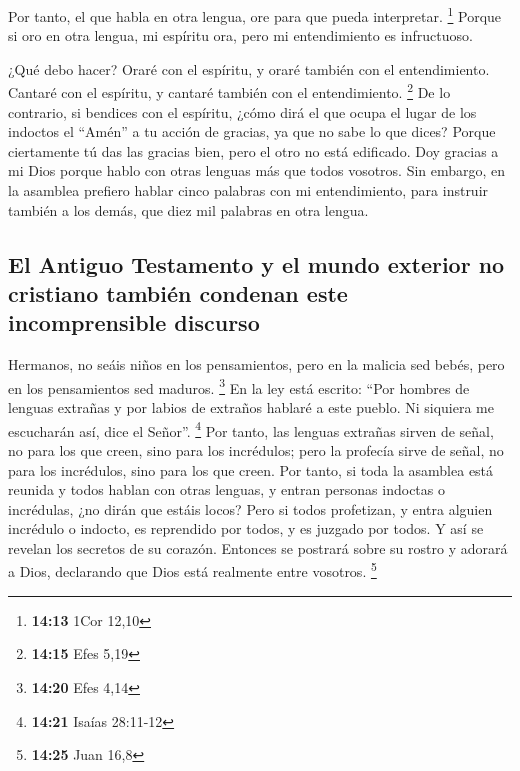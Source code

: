 \begin{paracol}{2}
 Por tanto, el que habla en otra lengua, ore para que
pueda interpretar. \footnote{\textbf{14:13} 1Cor 12,10} 
Porque si oro en otra lengua, mi espíritu ora, pero mi entendimiento es
infructuoso.

 ¿Qué debo hacer? Oraré con el espíritu, y oraré también
con el entendimiento. Cantaré con el espíritu, y cantaré también con el
entendimiento. \footnote{\textbf{14:15} Efes 5,19}  De lo
contrario, si bendices con el espíritu, ¿cómo dirá el que ocupa el lugar
de los indoctos el ``Amén'' a tu acción de gracias, ya que no sabe lo
que dices?  Porque ciertamente tú das las gracias bien,
pero el otro no está edificado.  Doy gracias a mi Dios
porque hablo con otras lenguas más que todos vosotros. 
Sin embargo, en la asamblea prefiero hablar cinco palabras con mi
entendimiento, para instruir también a los demás, que diez mil palabras
en otra lengua.

\hypertarget{el-antiguo-testamento-y-el-mundo-exterior-no-cristiano-tambiuxe9n-condenan-este-incomprensible-discurso}{%
\subsection{El Antiguo Testamento y el mundo exterior no cristiano
también condenan este incomprensible
discurso}\label{el-antiguo-testamento-y-el-mundo-exterior-no-cristiano-tambiuxe9n-condenan-este-incomprensible-discurso}}

 Hermanos, no seáis niños en los pensamientos, pero en la
malicia sed bebés, pero en los pensamientos sed maduros. \footnote{\textbf{14:20}
  Efes 4,14}  En la ley está escrito: ``Por hombres de
lenguas extrañas y por labios de extraños hablaré a este pueblo. Ni
siquiera me escucharán así, dice el Señor''. \footnote{\textbf{14:21}
  Isaías 28:11-12}  Por tanto, las lenguas extrañas
sirven de señal, no para los que creen, sino para los incrédulos; pero
la profecía sirve de señal, no para los incrédulos, sino para los que
creen.  Por tanto, si toda la asamblea está reunida y
todos hablan con otras lenguas, y entran personas indoctas o incrédulas,
¿no dirán que estáis locos?  Pero si todos profetizan, y
entra alguien incrédulo o indocto, es reprendido por todos, y es juzgado
por todos.  Y así se revelan los secretos de su corazón.
Entonces se postrará sobre su rostro y adorará a Dios, declarando que
Dios está realmente entre vosotros. \footnote{\textbf{14:25} Juan 16,8}


\end{paracol}
